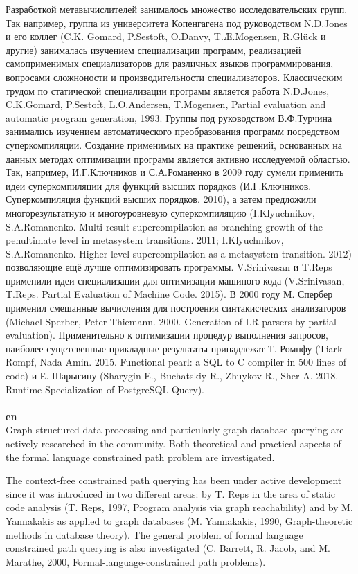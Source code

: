 \documentclass[12pt]{article}  %
\theoremstyle{remark}
\begin{document}
Разработкой метавычислителей занималось множество исследовательских групп. Так например, группа из университета Копенгагена под руководством N.D.Jones и его коллег (C.K. Gomard, P.Sestoft, O.Danvy, T.Æ.Mogensen, R.Glück и другие) занималась изучением специализации программ, реализацией самоприменимых специализаторов для различных языков программирования, вопросами сложноности и производительности специализаторов. Классическим трудом по статической специализации программ является работа N.D.Jones, C.K.Gomard, P.Sestoft, L.O.Andersen, T.Mogensen,
Partial evaluation and automatic program generation, 1993. Группы под руководством В.Ф.Турчина занимались изучением автоматического преобразования программ посредством суперкомпиляции. Создание применимых на практике решений, основанных на данных методах оптимизации программ является активно исследуемой областью. Так, например, И.Г.Ключников и С.А.Романенко в 2009 году сумели применить идеи суперкомпиляции для функций высших порядков (И.Г.Ключников. Суперкомпиляция функций высших порядков. 2010), а затем предложили многорезультатную и многоуровневую суперкомпиляцию (I.Klyuchnikov, S.A.Romanenko. Multi-result supercompilation as branching growth of the penultimate level in metasystem transitions. 2011; I.Klyuchnikov, S.A.Romanenko. Higher-level supercompilation as a metasystem transition. 2012) позволяющие ещё лучше оптимизировать программы. V.Srinivasan и T.Reps применили идеи специализации для оптимизации машиного кода (V.Srinivasan, T.Reps. Partial Evaluation of Machine Code. 2015). В 2000 году М. Спербер применил смешанные вычисления для построения синтакисческих анализаторов (Michael Sperber, Peter Thiemann. 2000. Generation of LR parsers by partial evaluation). Применительно к оптимизации процедур выполнения запросов, наиболее сущетсвенные прикладные результаты принадлежат Т. Ромпфу (Tiark Rompf, Nada Amin. 2015. Functional pearl: a SQL to C compiler in 500 lines of code) и Е. Шарыгину (Sharygin E., Buchatskiy R., Zhuykov R., Sher A. 2018. Runtime Specialization of PostgreSQL Query).
\\
\\
\textbf{en}\\

Graph-structured data processing and particularly graph database querying are actively researched in the community. Both theoretical and practical aspects of the formal language constrained path problem are investigated.

The context-free constrained path querying has been under active development since it was introduced in two different areas: by T. Reps in the area of static code analysis (T. Reps, 1997, Program analysis via graph reachability) and by M. Yannakakis as applied to graph databases (M. Yannakakis, 1990, Graph-theoretic methods in database theory). The general problem of formal language constrained path querying is also investigated (C. Barrett, R. Jacob, and M. Marathe, 2000, Formal-language-constrained path problems).
\end{document}
